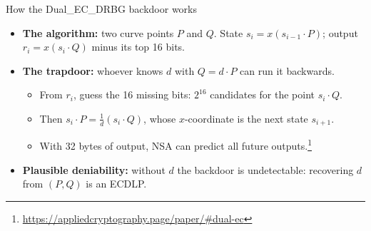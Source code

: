 \ifdefined\PRESENTATION\else\PassOptionsToClass{handout}{beamer}\fi\documentclass[aspectratio=169, lualatex]{beamer}
\begin{document}
\begin{frame}{How the Dual\_EC\_DRBG backdoor works}
	\begin{itemize}[<+->]
		\item \textbf{The algorithm:} two curve points $P$ and $Q$. State $s_i = x(s_{i-1} \cdot P)$; output $r_i = x(s_i \cdot Q)$ minus its top 16 bits.
		\item \textbf{The trapdoor:} whoever knows $d$ with $Q = d \cdot P$ can run it backwards.
		      \begin{itemize}
			      \item From $r_i$, guess the 16 missing bits: $2^{16}$ candidates for the point $s_i \cdot Q$.
			      \item Then $s_i \cdot P = \frac{1}{d}(s_i \cdot Q)$, whose $x$-coordinate is the next state $s_{i+1}$.
			      \item With 32 bytes of output, NSA can predict all future outputs.\footnote{\url{https://appliedcryptography.page/paper/\#dual-ec}}
		      \end{itemize}
		\item \textbf{Plausible deniability:} without $d$ the backdoor is undetectable: recovering $d$ from $(P, Q)$ is an ECDLP.
	\end{itemize}
\end{frame}
\end{document}
